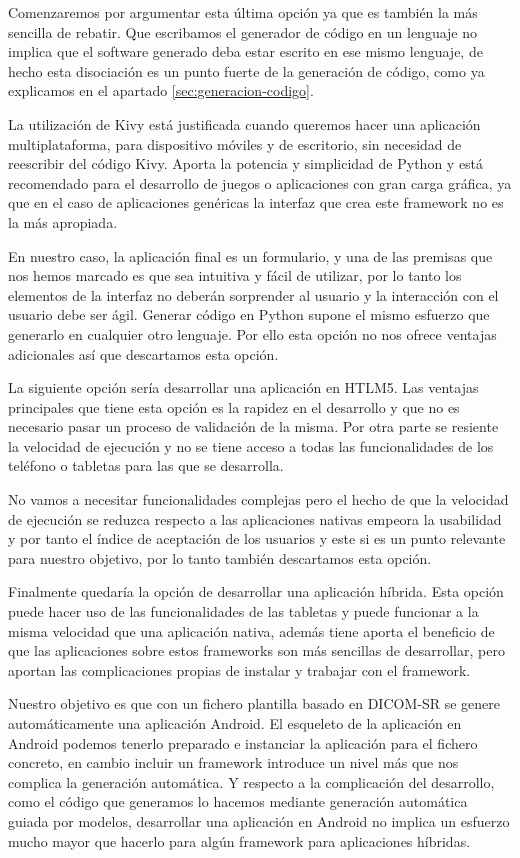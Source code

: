 Comenzaremos por argumentar esta última opción ya que es también la más sencilla de rebatir. Que escribamos el generador de código en un lenguaje no implica que el software generado deba estar escrito en ese mismo lenguaje, de hecho esta disociación es un punto fuerte de la generación de código, como ya explicamos en el apartado \ref{sec:generacion-codigo}.\par 
La utilización de Kivy está justificada cuando queremos hacer una aplicación multiplataforma, para dispositivo móviles y de escritorio, sin necesidad de reescribir del código Kivy. Aporta la potencia y simplicidad de Python y está recomendado para el desarrollo de juegos o aplicaciones con gran carga gráfica, ya que en el caso de aplicaciones genéricas la interfaz que crea este framework no es la más apropiada.\par
En nuestro caso, la aplicación final es un formulario,  y una de las premisas que nos hemos marcado es que sea intuitiva y fácil de utilizar, por lo tanto los elementos de la interfaz no deberán sorprender al usuario y la interacción con el usuario debe ser ágil. Generar código en Python supone el mismo esfuerzo que generarlo en cualquier otro lenguaje. Por ello esta opción no nos ofrece ventajas adicionales así que descartamos esta opción.\medskip\par

La siguiente opción sería desarrollar una aplicación en HTLM5.
Las ventajas principales que tiene esta opción es la rapidez en el desarrollo y que no es necesario pasar un proceso de validación de la misma. Por otra parte se resiente la velocidad de ejecución y no se tiene acceso a todas las funcionalidades de los teléfono o tabletas para las que se desarrolla.\par 
No vamos a necesitar funcionalidades complejas pero el hecho de que la velocidad de ejecución se reduzca respecto a las aplicaciones nativas empeora la usabilidad y por tanto el índice de aceptación de los usuarios y este si es un punto relevante para nuestro objetivo, por lo tanto también descartamos esta opción.\medskip\par

Finalmente quedaría la opción de desarrollar una aplicación híbrida.
Esta opción puede hacer uso de las funcionalidades de las tabletas y puede funcionar a la misma velocidad que una aplicación nativa, además tiene aporta el beneficio de que las aplicaciones sobre estos frameworks son más sencillas de desarrollar, pero aportan las complicaciones propias de instalar y trabajar con el framework.\par
Nuestro objetivo es que con un fichero plantilla basado en DICOM-SR se genere automáticamente una aplicación Android. El esqueleto de la aplicación en Android podemos tenerlo preparado e instanciar la aplicación para el fichero concreto, en cambio incluir un framework introduce un nivel más que nos complica la generación automática. Y respecto a la complicación del desarrollo, como el código que generamos lo hacemos mediante generación automática guiada por modelos, desarrollar una aplicación en Android no implica un esfuerzo mucho mayor que hacerlo para algún framework para aplicaciones híbridas.\medskip\par

